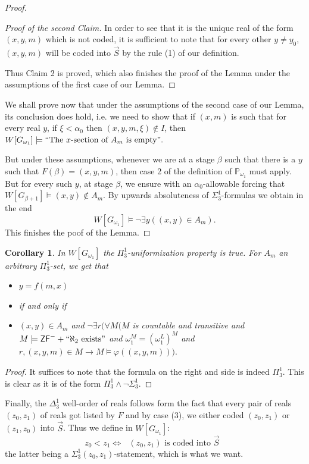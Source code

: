 \documentclass[a4paper,11pt]{article}
\newtheorem{corollary}[theorem]{Corollary}
\newcommand{\forceP}{\mathbb{P}}
\newcommand{\ZFP}{\mathsf{ZF}^-}
\begin{document}
\begin{proof}
\begin{proof}[Proof of the second Claim]
In order to see that it is the unique real of the form $(x,y,m)$ which is not coded, it is sufficient to note that for every other $y \ne y_0$, $(x,y,m)$ will be coded into $\vec{S}$ by the rule (1) of our definition.

Thus Claim 2 is proved, which also finishes the proof of the Lemma under the assumptions of the first case of our Lemma.
\end{proof}


\medskip
We shall prove now that under the assumptions of the second case of our Lemma, its conclusion does hold, i.e. we need to show that if $(x,m)$ is such that for every real $y$, if $\xi < \alpha_0$ then  $(x,y,m,\xi) \notin I$, then
$W[G_{\omega_1}] \models `` \text{The $x$-section of $A_m$ is empty}".$

But under these assumptions, whenever we are at a stage $\beta$ such that there is a $y$ such that $F(\beta)=(x,y,m)$, then case 2 of the definition of $\forceP_{\omega_1}$ must apply. But for every such $y$, at stage $\beta$, we ensure with an $\alpha_0$-allowable forcing that $W[G_{\beta+1}] \models (x,y) \notin A_m$. By upwards absoluteness of $\Sigma^1_3$-formulas  we obtain  in the end \[W
[G_{\omega_1}] \models \lnot \exists y ( (x,y) \in A_m). \]
This finishes the poof of the Lemma.


\end{proof}
\begin{corollary}
In $W[G_{\omega_1}]$ the $\Pi^1_3$-uniformization property is true.
For $A_m$ an arbitrary $\Pi^1_3$-set, we get that
\begin{itemize}
\item[] $y=f(m,x)$ 
\item[]\qquad if and only if
\item[] $(x,y) \in A_m$ and $\lnot \exists r ( \forall M (M$ is countable and transitive and $ M \models \ZFP+`` \text{$\aleph_2$ exists}" $  and  $\omega_1^M=(\omega_1^L)^M $ and $ r, (x,y,m) \in M  \rightarrow M \models \varphi((x,y,m)) ).$
\end{itemize}

\end{corollary}
\begin{proof}
It suffices to note that the formula on the right and side is indeed $\Pi^1_3$. This is clear as it is of the form $\Pi^1_3 \land \lnot \Sigma^1_3$.
\end{proof}

Finally, the $\Delta^1_3$ well-order of reals follows form the fact that every pair of reals $(z_0,z_1)$ of reals got listed by $F$ and by case (3), we either coded $(z_0,z_1)$ or $(z_1,z_0)$ into $\vec{S}$. 
Thus we define in $W[G_{\omega_1}]$:
\[ z_0 < z_1 \Leftrightarrow \text{ $(z_0,z_1)$ is coded into $\vec{S}$ } \] 
the latter being a $\Sigma^1_3 (z_0,z_1)$-statement, which is what we want.
\end{document}
